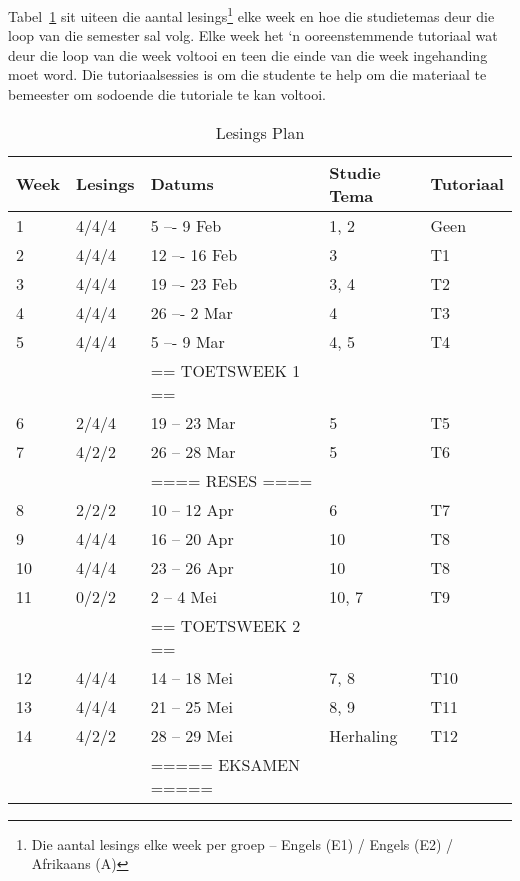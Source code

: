         Tabel~\ref{tab:lec_plan} sit uiteen die aantal lesings\footnote{Die
        aantal lesings elke week per groep -- Engels (E1) / Engels (E2) /
        Afrikaans (A)} elke week en hoe die studietemas deur die loop van die
        semester sal volg. Elke week het `n ooreenstemmende tutoriaal wat deur
        die loop van die week voltooi en teen die einde van die week
        ingehanding moet word. Die tutoriaalsessies is om die studente te help
        om die materiaal te bemeester om sodoende die tutoriale te kan voltooi.

        \begin{table}[!h]
            \begin{center}
             \begin{tabular}{|l|l|l|l|l|}
                 \hline
                 {\bf Week} & {\bf Lesings} & {\bf Datums} & %
                 {\bf Studie Tema} & {\bf Tutoriaal} \\
                 \hline
                 1  & 4/4/4   &  5 –-  9 Feb      & 1, 2  & Geen \\
                 2  & 4/4/4   & 12 –- 16 Feb      & 3     & T1 \\
                 3  & 4/4/4   & 19 –- 23 Feb      & 3, 4  & T2 \\
                 4  & 4/4/4   & 26 –-  2 Mar      & 4     & T3 \\
                 5  & 4/4/4   &  5 –-  9 Mar      & 4, 5  & T4 \\
                    &       & == TOETSWEEK 1 == &       & \\
                 6  & 2/4/4   & 19 -- 23 Mar      & 5     & T5 \\
                 7  & 4/2/2   & 26 -- 28 Mar      & 5     & T6 \\
                    &       & ==== RESES ==== &       & \\
                 8  & 2/2/2   & 10 -- 12 Apr      & 6     & T7 \\
                 9  & 4/4/4   & 16 -- 20 Apr      & 10    & T8 \\
                 10 & 4/4/4   & 23 -- 26 Apr      & 10    & T8 \\
                 11 & 0/2/2   &  2 --  4 Mei      & 10, 7 & T9 \\
                    &       & == TOETSWEEK 2 == &       & \\
                 12 & 4/4/4   & 14 -- 18 Mei      & 7, 8  & T10 \\
                 13 & 4/4/4   & 21 -- 25 Mei      & 8, 9  & T11 \\
                 14 & 4/2/2   & 28 -- 29 Mei      & Herhaling & T12 \\
                    &       & ===== EKSAMEN ===== &       & \\
                 \hline
             \end{tabular}
             \caption{Lesings Plan} \label{tab:lec_plan}
            \end{center}
        \end{table}



